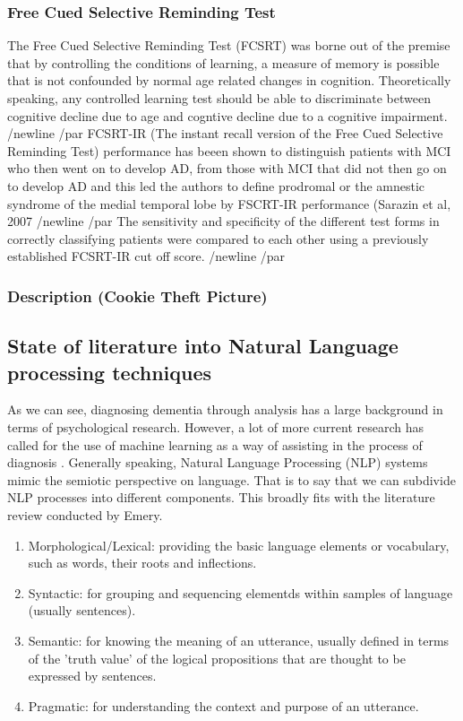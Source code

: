 \documentclass{article}
\begin{document}
\subsubsection{Free Cued Selective Reminding Test}
The Free Cued Selective Reminding Test (FCSRT) was borne out of the premise that by controlling the conditions of learning, a measure of memory is possible that is not confounded by normal age related changes in cognition. Theoretically speaking, any controlled learning test should be able to discriminate between cognitive decline due to age and cogntive decline due to a cognitive impairment. /newline
/par
FCSRT-IR (The instant recall version of the Free Cued Selective Reminding Test) performance has beeen shown to distinguish patients with MCI who then went on to develop AD, from those with MCI that did not then go on to develop AD and this led the authors to define prodromal or the amnestic syndrome of the medial temporal lobe by FSCRT-IR performance (Sarazin et al, 2007 /newline
/par
The sensitivity and specificity of the different test forms in correctly classifying patients were compared to each other using a previously established FCSRT-IR cut off score. /newline
/par



\subsubsection{ Description (Cookie Theft Picture)}


\subsection{State of literature into Natural Language processing techniques}
As we can see, diagnosing dementia through analysis has a large background in terms of psychological research. However, a lot of more current research has called for the use of machine learning as a way of assisting in the process of diagnosis \cite{Boschi2017}. Generally speaking, Natural Language Processing (NLP) systems mimic the semiotic perspective on language. That is to say that we can subdivide NLP processes into different components. This broadly fits with the literature review conducted by Emery.
\begin{enumerate}
	\item Morphological/Lexical: providing the basic language elements or vocabulary, such as words, their roots and inflections.
	\item Syntactic: for grouping and sequencing elementds within samples of language (usually sentences).
	\item Semantic: for knowing the meaning of an utterance, usually defined in terms of the 'truth value' of the logical propositions that are thought to be expressed by sentences.
	\item Pragmatic: for understanding the context and purpose of an utterance.
\end{enumerate}
\end{document}
